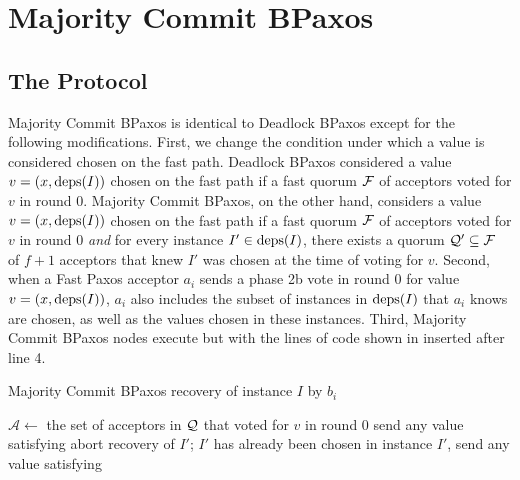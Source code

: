 \section{Majority Commit BPaxos}
\subsection{The Protocol}
Majority Commit BPaxos is identical to Deadlock BPaxos except for the following
modifications.
%
First, we change the condition under which a value is considered chosen on the
fast path.
%
Deadlock BPaxos considered a value $v = (x, \text{deps}(I))$ chosen on the fast path
if a fast quorum $\mathcal{F}$ of acceptors voted for $v$ in round $0$.
%
Majority Commit BPaxos, on the other hand, considers a value $v = (x,
\text{deps}(I))$ chosen on the fast path if a fast quorum $\mathcal{F}$ of acceptors
voted for $v$ in round $0$ \emph{and} for every instance $I' \in \text{deps}(I)$,
there exists a quorum $\mathcal{Q}' \subseteq \mathcal{F}$ of $f + 1$ acceptors
that knew $I'$ was chosen at the time of voting for $v$.
%
Second, when a Fast Paxos acceptor $a_i$ sends a phase 2b vote in round $0$ for
value $v = (x, \text{deps}(I))$, $a_i$ also includes the subset of instances in
$\text{deps}(I)$ that $a_i$ knows are chosen, as well as the values chosen in these
instances.
%
Third, Majority Commit BPaxos nodes execute  but with
the lines of code shown in  inserted after line
4.

\begin{algorithm}[ht]
  \caption{Majority Commit BPaxos recovery of instance $I$ by $b_i$}%
  \begin{algorithmic}[1]
    \makeatletter
    \setcounter{ALG@line}{4}
    \makeatother
    \State $\mathcal{A} \gets$ the set of acceptors in $\mathcal{Q}$ that voted for
           $v$ in round $0$
      \State send any value satisfying 
    \EndIf{}
        \State abort recovery of $I'$; $I'$ has already been chosen
      \Else{}
        \State in instance $I'$, send any value satisfying
      \EndIf{}
    \EndIf{}
  \end{algorithmic}
\end{algorithm}

